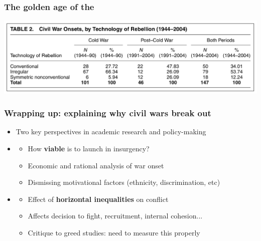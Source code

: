 \documentclass[aspectratio=43]{beamer}
\begin{document}
\begin{frame}
\frametitle{The golden age of the }
\centering

\includegraphics[width = \textwidth]{img/kalyvas_balcells_table}

\end{frame}

\begin{frame}
\frametitle{Wrapping up: explaining why civil wars break out}
\centering

\begin{itemize}
  \item<1-> Two key perspectives in academic research and policy-making
  \item<2-> 
    \begin{itemize}
      \item How \textbf{viable} is to launch in insurgency?
      \item Economic and rational analysis of war onset
      \item Dismissing motivational factors (ethnicity, discrimination, etc)
    \end{itemize}
  \item<3-> 
  \begin{itemize}
    \item Effect of \textbf{horizontal inequalities} on conflict
    \item Affects decision to fight, recruitment, internal cohesion...
    \item Critique to greed studies: need to measure this properly
  \end{itemize}
\end{itemize}

\end{frame}
\end{document}
